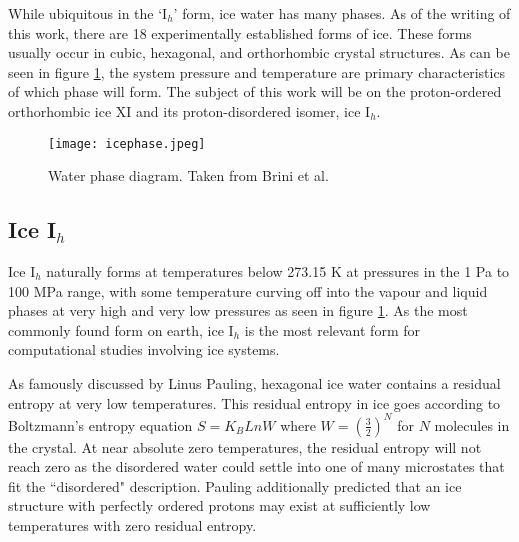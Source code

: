 While ubiquitous in the `I$_{h}$' form, ice water has many phases.
As of the writing of this work, there are 18 experimentally established forms of ice. 
These forms usually occur in cubic, hexagonal, and orthorhombic crystal structures.
As can be seen in figure \ref{fig:icePhases}, the system pressure and temperature are primary characteristics of which phase will form.
The subject of this work will be on the proton-ordered orthorhombic ice XI and its proton-disordered isomer, ice I$_{h}$.

\begin{figure}
	
	\centering
	
	\texttt{[image: icephase.jpeg]}
	
	\caption{Water phase diagram. Taken from Brini et al. \cite{BriniWaterProperties}}
	
	\label{fig:icePhases}
	
\end{figure}

\subsection{Ice I$_{h}$}

Ice I$_{h}$ naturally forms at temperatures below 273.15 K at pressures in the 1 Pa to 100 MPa range,\cite{IceTPLimits} with some temperature curving off into the vapour and liquid phases at very high and very low pressures as seen in figure \ref{fig:icePhases}.
As the most commonly found form on earth, ice I$_{h}$ is the most relevant form for computational studies involving ice systems.

As famously discussed by Linus Pauling, hexagonal ice water contains a residual entropy at very low temperatures.\cite{PaulingIce} 
This residual entropy in ice goes according to Boltzmann's entropy equation $S=K_{B}LnW$ where $W=(\frac{3}{2})^{N}$ for $N$ molecules in the crystal.
At near absolute zero temperatures, the residual entropy will not reach zero as the disordered water could settle into one of many microstates that fit the ``disordered" description.
Pauling additionally predicted that an ice structure with perfectly ordered protons may exist at sufficiently low temperatures with zero residual entropy.

